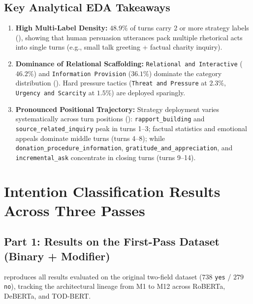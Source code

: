 \subsection{Key Analytical EDA Takeaways}
\begin{enumerate}
  \item \textbf{High Multi-Label Density:} $48.9\%$ of turns carry 2 or more strategy labels (), showing that human persuasion utterances pack multiple rhetorical acts into single turns (e.g., small talk greeting + factual charity inquiry).
  \item \textbf{Dominance of Relational Scaffolding:} \texttt{Relational and Interactive} ($46.2\%$) and \texttt{Information Provision} ($36.1\%$) dominate the category distribution (). Hard pressure tactics (\texttt{Threat and Pressure} at $2.3\%$, \texttt{Urgency and Scarcity} at $1.5\%$) are deployed sparingly.
  \item \textbf{Pronounced Positional Trajectory:} Strategy deployment varies systematically across turn positions (): \texttt{rapport\_building} and \texttt{source\_related\_inquiry} peak in turns 1--3; factual statistics and emotional appeals dominate middle turns (turns 4--8); while \texttt{donation\_procedure\_information}, \texttt{gratitude\_and\_appreciation}, and \texttt{incremental\_ask} concentrate in closing turns (turns 9--14).
\end{enumerate}

\section{Intention Classification Results Across Three Passes}
\label{sec:intention-results}

\subsection{Part 1: Results on the First-Pass Dataset (Binary + Modifier)}
 reproduces all results evaluated on the original two-field dataset ($738$ \texttt{yes} / $279$ \texttt{no}), tracking the architectural lineage from M1 to M12 across RoBERTa, DeBERTa, and TOD-BERT.

